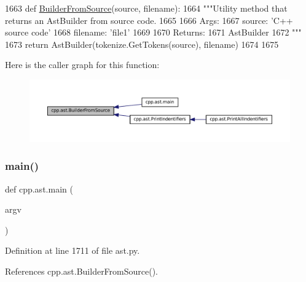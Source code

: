 \begin{DoxyCode}
1663 \textcolor{keyword}{def }\hyperlink{namespacecpp_1_1ast_a696471f0d7971a0789824803a008cf6b}{BuilderFromSource}(source, filename):
1664     \textcolor{stringliteral}{"""Utility method that returns an AstBuilder from source code.}
1665 \textcolor{stringliteral}{}
1666 \textcolor{stringliteral}{    Args:}
1667 \textcolor{stringliteral}{      source: 'C++ source code'}
1668 \textcolor{stringliteral}{      filename: 'file1'}
1669 \textcolor{stringliteral}{}
1670 \textcolor{stringliteral}{    Returns:}
1671 \textcolor{stringliteral}{      AstBuilder}
1672 \textcolor{stringliteral}{    """}
1673     \textcolor{keywordflow}{return} AstBuilder(tokenize.GetTokens(source), filename)
1674 
1675 
\end{DoxyCode}
Here is the caller graph for this function\+:
\nopagebreak
\begin{figure}[H]
\begin{center}
\leavevmode
\includegraphics[width=350pt]{namespacecpp_1_1ast_a696471f0d7971a0789824803a008cf6b_icgraph}
\end{center}
\end{figure}
\mbox{\label{namespacecpp_1_1ast_acd29cc27c3bff13bf3e055575b8e958a}} 
\subsubsection{\texorpdfstring{main()}{main()}}
{\footnotesize\ttfamily def cpp.\+ast.\+main (\begin{DoxyParamCaption}\item[{}]{argv }\end{DoxyParamCaption})}



Definition at line 1711 of file ast.\+py.



References cpp.\+ast.\+Builder\+From\+Source().


